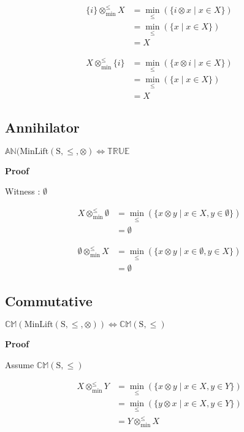 \documentclass[10pt]{article}
\newcommand{\propname}[1]{{\mathbb{#1}}}
\newcommand{\minlift}{\otimes_{\min}^{\leq}}
\newcommand{\proof}{\vspace{1em} \textbf{Proof} \vspace{1em}}
\newenvironment{ind}[0]{\begin{addmargin}[1em]{0em}\vspace{0.5em}}{\end{addmargin}\vspace{0.5em}}
\begin{document}
\begin{align*}
\{ i \} \minlift X 	& = \min_\leq(\{i \otimes x \mid x \in X\}) \\
					& = \min_\leq(\{x \mid x \in X\}) \\
					& = X
\end{align*}

\begin{align*}
X \minlift \{ i \} 	& = \min_\leq(\{x \otimes i \mid x \in X\}) \\
					& = \min_\leq(\{x \mid x \in X\}) \\
					& = X
\end{align*}


\subsection{Annihilator}

$\propname{AN}(\mathrm{MinLift(S,\leq,\otimes)} \Leftrightarrow \propname{TRUE}$

\proof

Witness : $\emptyset$

\begin{align*}
X \minlift \emptyset 	& = \min_\leq(\{ x \otimes y \mid x \in X, y \in \emptyset\}) \\
						& = \emptyset
\end{align*}

\begin{align*}
\emptyset \minlift X 	& = \min_\leq(\{ x \otimes y \mid x \in \emptyset, y \in X\}) \\
						& = \emptyset
\end{align*}

\subsection{Commutative}

$\propname{CM}(\mathrm{MinLift(S,\leq,\otimes)}) \Leftrightarrow \propname{CM}\mathrm{(S,\leq)}$

\proof

Assume $\propname{CM}\mathrm{(S,\leq)}$

\begin{ind}
\begin{align*}
X \minlift Y 	& = \min_\leq(\{x \otimes y \mid x \in X, y \in Y\}) \\
				& = \min_\leq(\{y \otimes x \mid x \in X, y \in Y\}) \\
				& = Y \minlift X
\end{align*}
\end{ind}
\end{document}
